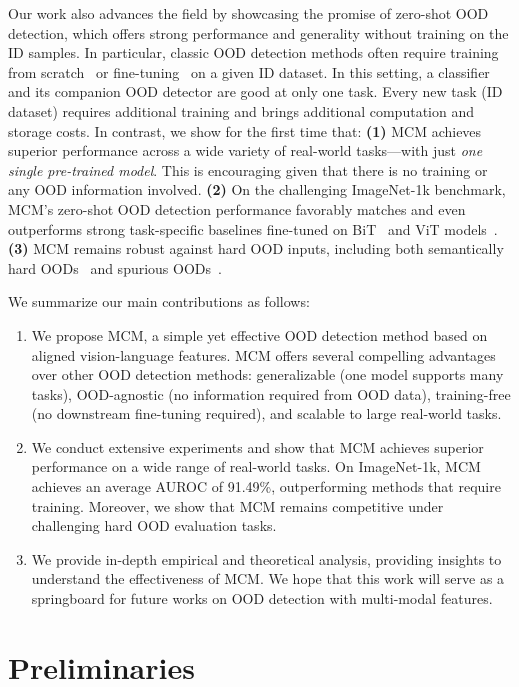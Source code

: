 \documentclass{article}
\begin{document}
Our work also advances the field by showcasing the promise of zero-shot OOD detection, which offers strong performance and generality without training on the ID samples. In particular, classic OOD detection methods often require training from scratch~\cite{chen2021robustifying,hendrycks2018deep} or fine-tuning~\cite{fort2021exploring,huang2021mos} on a given ID dataset. In this setting, a classifier and its companion OOD detector are good at only one task.
Every new task (ID dataset) requires additional training and brings additional computation and storage costs.
In contrast, we show for the first time that: \textbf{(1)} MCM
achieves
superior performance across a wide variety of real-world tasks---with just \emph{one single pre-trained model}. This is encouraging given that there is no training or any OOD information involved. \textbf{(2)} On the challenging ImageNet-1k benchmark, MCM's zero-shot OOD detection performance favorably matches and even outperforms strong task-specific baselines fine-tuned on BiT~\cite{huang2021mos} and ViT models~\cite{fort2021exploring}. \textbf{(3)} MCM remains robust against hard OOD inputs, including both semantically hard OODs~\cite{winkens2020contrastive} and spurious OODs~\cite{ming2022spurious}.

We summarize our main contributions as follows:
\begin{enumerate}
\item We propose MCM, a simple yet effective OOD detection method based on aligned vision-language features.
MCM offers several compelling advantages over other OOD detection methods:
 generalizable (one model supports many tasks), OOD-agnostic (no information required from OOD data), training-free (no downstream fine-tuning required), and scalable to large real-world tasks.
\item We conduct extensive experiments and show that MCM achieves superior performance on a wide range of real-world tasks. On ImageNet-1k, MCM achieves an average AUROC of 91.49\%, outperforming methods that require training. Moreover, we show that MCM remains competitive under challenging hard OOD evaluation tasks.
\item We provide in-depth empirical and theoretical analysis, providing insights to understand the effectiveness of MCM. We hope that this work will serve as a springboard for
future works on OOD detection with multi-modal features.  
\end{enumerate}

\section{Preliminaries}
\end{document}
